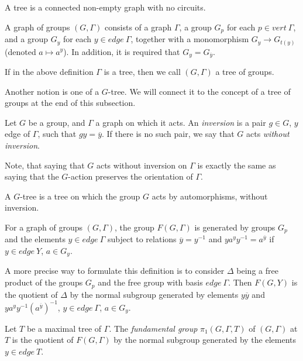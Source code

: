\begin{definition} 
    A tree is a connected non-empty graph with no circuits.
\end{definition}

\begin{definition}\label{grpgraph}
    A graph of groups $(G,\Gamma)$ consists of a graph $\Gamma$, a group $G_p$ for each $p \in vert\:\Gamma$, and a group $G_y$ for each $y \in edge \: \Gamma$, together with a monomorphism $G_y \to G_{t(y)}$ (denoted $a \mapsto a^y$). In addition, it is required that $G_y = G_{\overline{y}}$.
\end{definition}

If in the above definition $\Gamma$ is a tree, then we call $(G,\Gamma)$ a tree of groups.

Another notion is one of a $G$-tree. We will connect it to the concept of a tree of groups at the end of this subsection.

\begin{definition}
    Let $G$ be a group, and $\Gamma$ a graph on which it acts. An \emph{inversion} is a pair $g \in G$, $y$ edge of $\Gamma$, such that $gy = \overline{y}$. If there is no such pair, we say that $G$ acts \emph{without inversion}. 
\end{definition}

Note, that saying that $G$ acts without inversion on $\Gamma$ is exactly the same as saying that the $G$-action preserves the orientation of $\Gamma$.

\begin{definition}
    A $G$-tree is a tree on which the group $G$ acts by automorphisms, without inversion.
\end{definition}

\begin{definition}
    For a graph of groups $(G,\Gamma)$, the group $F(G,\Gamma)$ is generated by groups $G_p$ and the elements $y \in edge \: \Gamma$ subject to relations $\overline{y} = y^{-1}$ and $ya^yy^{-1} = a^{\overline{y}}$ if $y \in edge \: Y$, $a \in G_y$.
\end{definition}

A more precise way to formulate this definition is to consider $\Delta$ being a free product of the groups $G_p$ and the free group with basis $edge \: \Gamma$. Then $F(G,Y)$ is the quotient of $\Delta$ by the normal subgroup generated by elements $y\overline{y}$ and $ya^yy^{-1}(a^{\overline{y}})^{-1}$, $y \in edge\:\Gamma$, $a \in G_y$.

\begin{definition}
    Let $T$ be a maximal tree of $\Gamma$. The \emph{fundamental group} $\pi_1(G,\Gamma,T)$ of $(G,\Gamma)$ at $T$ is the quotient of $F(G,\Gamma)$ by the normal subgroup generated by the elements $y \in edge\:T$.
\end{definition}


